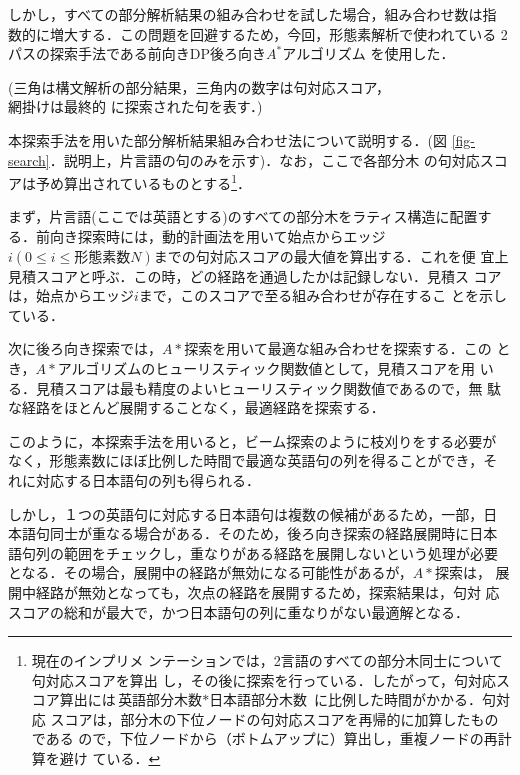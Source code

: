 しかし，すべての部分解析結果の組み合わせを試した場合，組み合わせ数は指
数的に増大する．この問題を回避するため，今回，形態素解析で使われている
2パスの探索手法である前向きDP後ろ向き$A^{*}$アルゴリズム
\cite{Nageta:ForwardDPBackwardAStar1994}を使用した．

\begin{figure*}
\begin{center}
\caption{部分解析結果組み合わせ探索例}\label{fig-search}
(三角は構文解析の部分結果，三角内の数字は句対応スコア，\\ 網掛けは最終的
に探索された句を表す．)
\end{center}
\end{figure*}

本探索手法を用いた部分解析結果組み合わせ法について説明する．(図
\ref{fig-search}．説明上，片言語の句のみを示す)．なお，ここで各部分木
の句対応スコアは予め算出されているものとする\footnote{現在のインプリメ
ンテーションでは，2言語のすべての部分木同士について句対応スコアを算出
し，その後に探索を行っている．したがって，句対応スコア算出には$\mbox
{英語部分木数} * \mbox{日本語部分木数}$ に比例した時間がかかる．句対応
スコアは，部分木の下位ノードの句対応スコアを再帰的に加算したものである
ので，下位ノードから（ボトムアップに）算出し，重複ノードの再計算を避け
ている．}．

まず，片言語(ここでは英語とする)のすべての部分木をラティス構造に配置す
る．前向き探索時には，動的計画法を用いて始点からエッジ$i (0 \leq i
\leq \mbox{形態素数}N)$までの句対応スコアの最大値を算出する．これを便
宜上見積スコアと呼ぶ．この時，どの経路を通過したかは記録しない．見積ス
コアは，始点からエッジ$i$まで，このスコアで至る組み合わせが存在するこ
とを示している．

次に後ろ向き探索では，$A*$探索を用いて最適な組み合わせを探索する．この
とき，$A*$アルゴリズムのヒューリスティック関数値として，見積スコアを用
いる．見積スコアは最も精度のよいヒューリスティック関数値であるので，無
駄な経路をほとんど展開することなく，最適経路を探索する．

このように，本探索手法を用いると，ビーム探索のように枝刈りをする必要が
なく，形態素数にほぼ比例した時間で最適な英語句の列を得ることができ，そ
れに対応する日本語句の列も得られる．

しかし，１つの英語句に対応する日本語句は複数の候補があるため，一部，日
本語句同士が重なる場合がある．そのため，後ろ向き探索の経路展開時に日本
語句列の範囲をチェックし，重なりがある経路を展開しないという処理が必要
となる．その場合，展開中の経路が無効になる可能性があるが，$A*$探索は，
展開中経路が無効となっても，次点の経路を展開するため，探索結果は，句対
応スコアの総和が最大で，かつ日本語句の列に重なりがない最適解となる．


